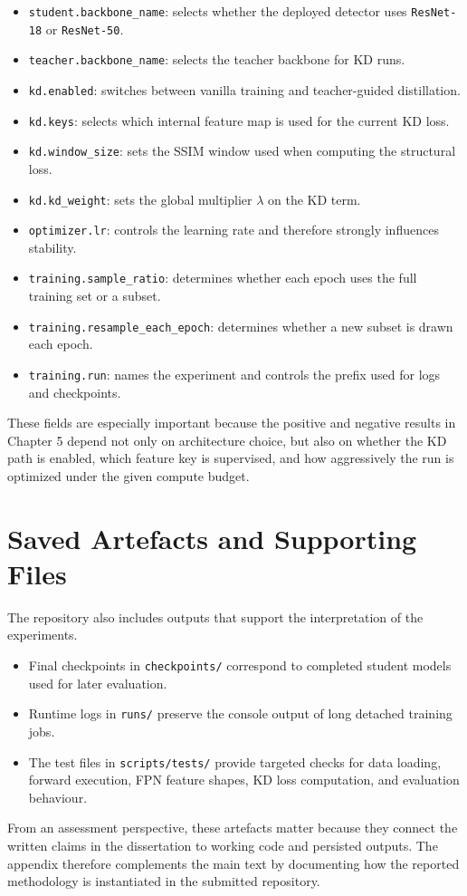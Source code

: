 \begin{itemize}
    \item \texttt{student.backbone\_name}: selects whether the deployed detector uses \texttt{ResNet-18} or \texttt{ResNet-50}.
    \item \texttt{teacher.backbone\_name}: selects the teacher backbone for KD runs.
    \item \texttt{kd.enabled}: switches between vanilla training and teacher-guided distillation.
    \item \texttt{kd.keys}: selects which internal feature map is used for the current KD loss.
    \item \texttt{kd.window\_size}: sets the SSIM window used when computing the structural loss.
    \item \texttt{kd.kd\_weight}: sets the global multiplier $\lambda$ on the KD term.
    \item \texttt{optimizer.lr}: controls the learning rate and therefore strongly influences stability.
    \item \texttt{training.sample\_ratio}: determines whether each epoch uses the full training set or a subset.
    \item \texttt{training.resample\_each\_epoch}: determines whether a new subset is drawn each epoch.
    \item \texttt{training.run}: names the experiment and controls the prefix used for logs and checkpoints.
\end{itemize}

These fields are especially important because the positive and negative results in Chapter 5 depend not only on architecture choice, but also on whether the KD path is enabled, which feature key is supervised, and how aggressively the run is optimized under the given compute budget.

\section{Saved Artefacts and Supporting Files}

The repository also includes outputs that support the interpretation of the experiments.

\begin{itemize}
    \item Final checkpoints in \texttt{checkpoints/} correspond to completed student models used for later evaluation.
    \item Runtime logs in \texttt{runs/} preserve the console output of long detached training jobs.
    \item The test files in \texttt{scripts/tests/} provide targeted checks for data loading, forward execution, FPN feature shapes, KD loss computation, and evaluation behaviour.
\end{itemize}

From an assessment perspective, these artefacts matter because they connect the written claims in the dissertation to working code and persisted outputs. The appendix therefore complements the main text by documenting how the reported methodology is instantiated in the submitted repository.
